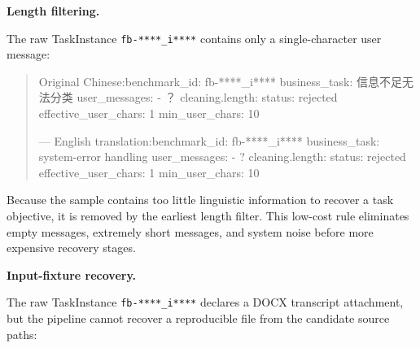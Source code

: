 \documentclass[11pt, a4paper, copyright, frontis]{frontis}
\newcommand{\inlinett}[1]{{\footnotesize\texttt{#1}}}
\newcommand{\caseheader}[1]{\noindent\colorbox{fbcaseblue}{\parbox{0.96\linewidth}{\color{white}\bfseries #1}}\vspace{0.5mm}\newline}
\newenvironment{casebox}{%
  \begin{quote}%
  \setlength{\parindent}{0pt}%
  \setlength{\parskip}{0pt}%
}{%
  \end{quote}%
}
\newenvironment{caselines}{%
  \begingroup
  \parindent0pt
  \parskip0pt
  \obeylines
  \obeyspaces
}{%
  \endgroup
}
\begin{document}
\caseheader{Length filtering.}
The raw TaskInstance \inlinett{fb-****\_i****} contains only a single-character user message:

\begin{casebox}\scriptsize\raggedright
\begin{caselines}
Original Chinese:\nopagebreak[4]
benchmark\_id: fb-****\_i****
business\_task: 信息不足无法分类
user\_messages:
- ？
cleaning.length:
  status: rejected
  effective\_user\_chars: 1
  min\_user\_chars: 10

---
English translation:\nopagebreak[4]
benchmark\_id: fb-****\_i****
business\_task: system-error handling
user\_messages:
- ?
cleaning.length:
  status: rejected
  effective\_user\_chars: 1
  min\_user\_chars: 10
\end{caselines}
\end{casebox}

Because the sample contains too little linguistic information to recover a task objective, it is removed by the earliest length filter. This low-cost rule eliminates empty messages, extremely short messages, and system noise before more expensive recovery stages.

\caseheader{Input-fixture recovery.}
The raw TaskInstance \inlinett{fb-****\_i****} declares a DOCX transcript attachment, but the pipeline cannot recover a reproducible file from the candidate source paths:
\end{document}
